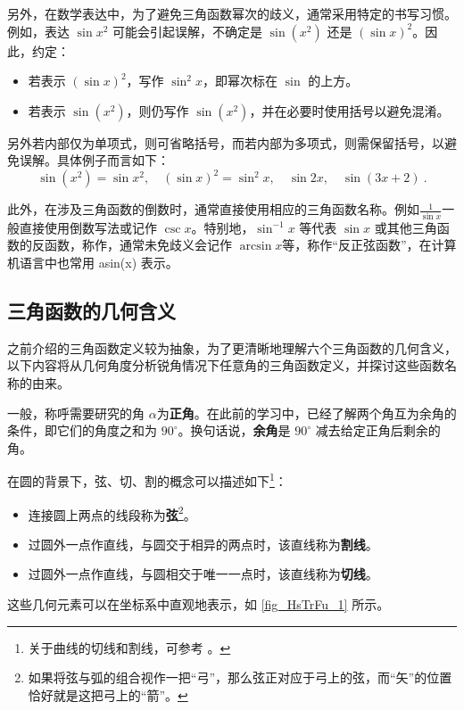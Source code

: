 另外，在数学表达中，为了避免三角函数幂次的歧义，通常采用特定的书写习惯。例如，表达 $\sin x^2$ 可能会引起误解，不确定是 $\sin(x^2)$ 还是 $(\sin x)^2$。因此，约定：
\begin{itemize}
\item 若表示 $(\sin x)^2$，写作 $\sin^2 x$，即幂次标在 $\sin$ 的上方。
\item 若表示 $\sin(x^2)$，则仍写作 $\sin(x^2)$，并在必要时使用括号以避免混淆。
\end{itemize}
另外若内部仅为单项式，则可省略括号，而若内部为多项式，则需保留括号，以避免误解。具体例子而言如下：
\begin{equation}
\sin(x^2) = \sin x^2,\quad (\sin x)^2 = \sin^2 x,\quad \sin2x,\quad\sin(3x+2)~.
\end{equation}

此外，在涉及三角函数的倒数时，通常直接使用相应的三角函数名称。例如$\displaystyle \frac{1}{\sin x}$一般直接使用倒数写法或记作 $\csc x$。特别地，$\sin^{-1} x$ 等代表 $\sin x$ 或其他三角函数的反函数，称作，通常未免歧义会记作 $\arcsin x$等，称作“反正弦函数”，在计算机语言中也常用 asin(x) 表示。

\subsection{三角函数的几何含义}

之前介绍的三角函数定义较为抽象，为了更清晰地理解六个三角函数的几何含义，以下内容将从几何角度分析锐角情况下任意角的三角函数定义，并探讨这些函数名称的由来。

一般，称呼需要研究的角 $\alpha$为\textbf{正角}。在此前的学习中，已经了解两个角互为余角的条件，即它们的角度之和为 $90^\circ$。换句话说，\textbf{余角}是 $90^\circ$ 减去给定正角后剩余的角。

在圆的背景下，弦、切、割的概念可以描述如下\footnote{关于曲线的切线和割线，可参考 。}：
\begin{itemize}
\item 连接圆上两点的线段称为\textbf{弦}\footnote{如果将弦与弧的组合视作一把“弓”，那么弦正对应于弓上的弦，而“矢”的位置恰好就是这把弓上的“箭”。}。
\item 过圆外一点作直线，与圆交于相异的两点时，该直线称为\textbf{割线}。
\item 过圆外一点作直线，与圆相交于唯一一点时，该直线称为\textbf{切线}。
\end{itemize}

这些几何元素可以在坐标系中直观地表示，如 \autoref{fig_HsTrFu_1} 所示。

